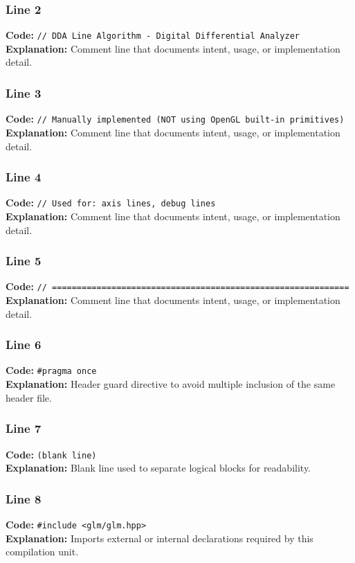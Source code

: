 \documentclass[11pt,a4paper]{article}
\begin{document}
\subsubsection*{Line 2}
\textbf{Code:} \verb|// DDA Line Algorithm - Digital Differential Analyzer|\\
\textbf{Explanation:} Comment line that documents intent, usage, or implementation detail.

\subsubsection*{Line 3}
\textbf{Code:} \verb|// Manually implemented (NOT using OpenGL built-in primitives)|\\
\textbf{Explanation:} Comment line that documents intent, usage, or implementation detail.

\subsubsection*{Line 4}
\textbf{Code:} \verb|// Used for: axis lines, debug lines|\\
\textbf{Explanation:} Comment line that documents intent, usage, or implementation detail.

\subsubsection*{Line 5}
\textbf{Code:} \verb|// ============================================================|\\
\textbf{Explanation:} Comment line that documents intent, usage, or implementation detail.

\subsubsection*{Line 6}
\textbf{Code:} \verb|#pragma once|\\
\textbf{Explanation:} Header guard directive to avoid multiple inclusion of the same header file.

\subsubsection*{Line 7}
\textbf{Code:} \texttt{(blank line)}\\
\textbf{Explanation:} Blank line used to separate logical blocks for readability.

\subsubsection*{Line 8}
\textbf{Code:} \verb|#include <glm/glm.hpp>|\\
\textbf{Explanation:} Imports external or internal declarations required by this compilation unit.
\end{document}
